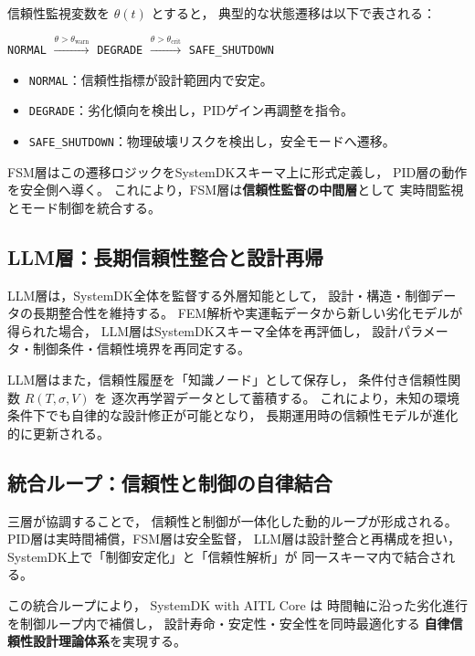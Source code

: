 信頼性監視変数を $\theta(t)$ とすると，
典型的な状態遷移は以下で表される：
\begin{center}
\texttt{NORMAL}
$\xrightarrow{\theta > \theta_{\text{warn}}}$
\texttt{DEGRADE}
$\xrightarrow{\theta > \theta_{\text{crit}}}$
\texttt{SAFE\_SHUTDOWN}
\end{center}

\begin{itemize}
  \item \texttt{NORMAL}：信頼性指標が設計範囲内で安定。
  \item \texttt{DEGRADE}：劣化傾向を検出し，PIDゲイン再調整を指令。
  \item \texttt{SAFE\_SHUTDOWN}：物理破壊リスクを検出し，安全モードへ遷移。
\end{itemize}

FSM層はこの遷移ロジックをSystemDKスキーマ上に形式定義し，
PID層の動作を安全側へ導く。
これにより，FSM層は\textbf{信頼性監督の中間層}として
実時間監視とモード制御を統合する。

\subsection{LLM層：長期信頼性整合と設計再帰}
LLM層は，SystemDK全体を監督する外層知能として，
設計・構造・制御データの長期整合性を維持する。
FEM解析や実運転データから新しい劣化モデルが得られた場合，
LLM層はSystemDKスキーマ全体を再評価し，
設計パラメータ・制御条件・信頼性境界を再同定する。

LLM層はまた，信頼性履歴を「知識ノード」として保存し，
条件付き信頼性関数 $R(T, \sigma, V)$ を
逐次再学習データとして蓄積する。
これにより，未知の環境条件下でも自律的な設計修正が可能となり，
長期運用時の信頼性モデルが進化的に更新される。

\subsection{統合ループ：信頼性と制御の自律結合}
三層が協調することで，
信頼性と制御が一体化した動的ループが形成される。
PID層は実時間補償，FSM層は安全監督，
LLM層は設計整合と再構成を担い，
SystemDK上で「制御安定化」と「信頼性解析」が
同一スキーマ内で結合される。

この統合ループにより，
SystemDK with AITL Core は
時間軸に沿った劣化進行を制御ループ内で補償し，
設計寿命・安定性・安全性を同時最適化する
\textbf{自律信頼性設計理論体系}を実現する。
